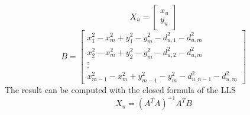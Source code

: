 \documentclass[12pt,twoside]{report}
\begin{document}
\begin{equation}
    X_u=\begin{bmatrix}
    x_u\\
    y_u
    \end{bmatrix}
\end{equation}
\begin{equation}
    B=\begin{bmatrix}
        x_{1}^2-x_m^2+y_{1}^2-y_m^2-d_{u,1}^2-d^2_{u,m}\\
        x_{2}^2-x_m^2+y_{2}^2-y_m^2-d_{u,2}^2-d^2_{u,m}\\
        \vdots\\
        x_{m-1}^2-x_m^2+y_{m-1}^2-y_m^2-d_{u,n-1}^2-d^2_{u,m}
    \end{bmatrix}
\end{equation}
The result can be computed with the closed formula of the LLS
\begin{equation}
    X_u=(A^TA)^{-1}A^TB
\end{equation}
\clearpage
\end{document}
